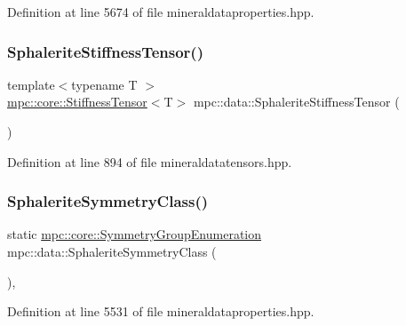 Definition at line 5674 of file mineraldataproperties.\+hpp.

\mbox{\label{namespacempc_1_1data_a032efffe1239af48e9d16ea2acbfd88b}} 
\subsubsection{\texorpdfstring{Sphalerite\+Stiffness\+Tensor()}{SphaleriteStiffnessTensor()}}
{\footnotesize\ttfamily template$<$typename T $>$ \\
\mbox{\hyperlink{structmpc_1_1core_1_1_stiffness_tensor}{mpc\+::core\+::\+Stiffness\+Tensor}}$<$T$>$ mpc\+::data\+::\+Sphalerite\+Stiffness\+Tensor (\begin{DoxyParamCaption}{ }\end{DoxyParamCaption})}



Definition at line 894 of file mineraldatatensors.\+hpp.

\mbox{\label{namespacempc_1_1data_a86fd71c8bff0ae24e586415d47116c47}} 
\subsubsection{\texorpdfstring{Sphalerite\+Symmetry\+Class()}{SphaleriteSymmetryClass()}}
{\footnotesize\ttfamily static \mbox{\hyperlink{namespacempc_1_1core_a9d979684062547055a0ef5c13077bad8}{mpc\+::core\+::\+Symmetry\+Group\+Enumeration}} mpc\+::data\+::\+Sphalerite\+Symmetry\+Class (\begin{DoxyParamCaption}{ }\end{DoxyParamCaption})\hspace{0.3cm}{\ttfamily [inline]}, {\ttfamily [static]}}



Definition at line 5531 of file mineraldataproperties.\+hpp.

\mbox{\label{namespacempc_1_1data_a73dd9dbc34446f35dd74f0fdff365a2e}} 
